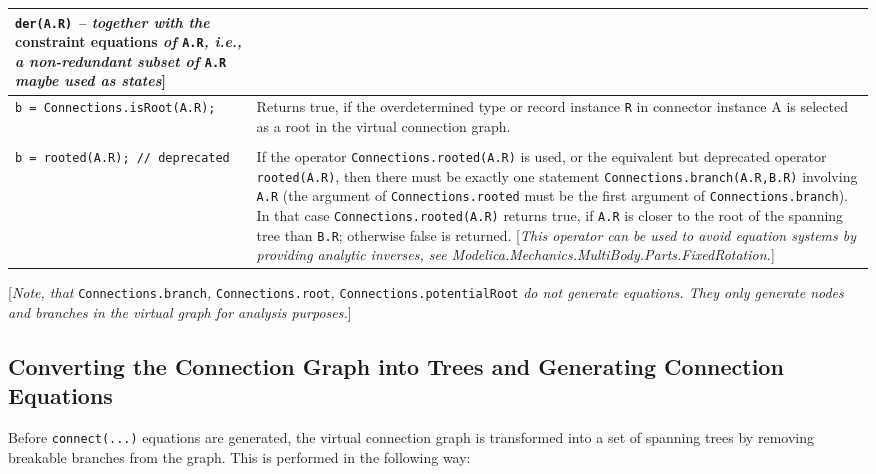 \begin{longtable}[]{|p{5.1cm}|p{10cm}|}
\lstinline!der(A.R)! \emph{-- together with the} constraint equations \emph{of}
\lstinline!A.R!\emph{, i.e., a non-redundant subset of} \lstinline!A.R! \emph{maybe used as
states}{]}
\\ \hline
\lstinline!b = Connections.isRoot(A.R);! & Returns true, if the overdetermined type
or record instance \lstinline!R! in connector instance A is selected as a root in
the virtual connection graph.\\ \hline
\begin{tabular}{@{}p{5.1cm}@{}}
\lstinline!b = Connections.rooted(A.R);!\\
\lstinline!b = rooted(A.R); // deprecated!
\end{tabular}
& If the operator \lstinline!Connections.rooted(A.R)!
is used, or the equivalent but deprecated operator \lstinline!rooted(A.R)!, then
there must be exactly one statement \lstinline!Connections.branch(A.R,B.R)!
involving \lstinline!A.R! (the argument of \lstinline!Connections.rooted! must be the first
argument of \lstinline!Connections.branch!). In that case \lstinline!Connections.rooted(A.R)!
returns true, if \lstinline!A.R! is closer to the root of the spanning tree than
\lstinline!B.R!; otherwise false is returned. {[}\emph{This operator can be used to
avoid equation systems by providing analytic inverses, see
Modelica.Mechanics.MultiBody.Parts.FixedRotation.}{]}\\ \hline
\end{longtable}

{[}\emph{Note, that} \lstinline!Connections.branch!\emph{,} \lstinline!Connections.root!\emph{,}
\lstinline!Connections.potentialRoot! \emph{do not generate equations. They only
generate nodes and branches in the virtual graph for analysis
purposes.}{]}

\subsection{Converting the Connection Graph into Trees and Generating Connection Equations}

Before \lstinline!connect(...)! equations are generated, the virtual connection
graph is transformed into a set of spanning trees by removing breakable
branches from the graph. This is performed in the following way:

